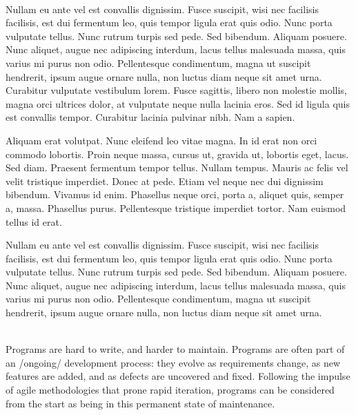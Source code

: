 \begin{titlepage}
\vspace{2cm}
\begin{addmargin}[-1cm]{-4cm}
\begin{flushright}
\sffamily\LARGE\titleen
\end{flushright}
\vfill
\noindent
\begin{minipage}[t]{9cm}

\\
Nullam eu ante vel est convallis dignissim.  Fusce suscipit, wisi nec facilisis
facilisis, est dui fermentum leo, quis tempor ligula erat quis odio.  Nunc porta
vulputate tellus.  Nunc rutrum turpis sed pede.  Sed bibendum.  Aliquam posuere.
Nunc aliquet, augue nec adipiscing interdum, lacus tellus malesuada massa, quis
varius mi purus non odio.  Pellentesque condimentum, magna ut suscipit
hendrerit, ipsum augue ornare nulla, non luctus diam neque sit amet urna.
Curabitur vulputate vestibulum lorem.  Fusce sagittis, libero non molestie
mollis, magna orci ultrices dolor, at vulputate neque nulla lacinia eros.  Sed
id ligula quis est convallis tempor.  Curabitur lacinia pulvinar nibh.  Nam a
sapien.

Aliquam erat volutpat.  Nunc eleifend leo vitae magna.  In id erat non orci
commodo lobortis.  Proin neque massa, cursus ut, gravida ut, lobortis eget,
lacus.  Sed diam.  Praesent fermentum tempor tellus.  Nullam tempus.  Mauris ac
felis vel velit tristique imperdiet.  Donec at pede.  Etiam vel neque nec dui
dignissim bibendum.  Vivamus id enim.  Phasellus neque orci, porta a, aliquet
quis, semper a, massa.  Phasellus purus.  Pellentesque tristique imperdiet
tortor.  Nam euismod tellus id erat.

Nullam eu ante vel est convallis dignissim.  Fusce suscipit, wisi nec facilisis
facilisis, est dui fermentum leo, quis tempor ligula erat quis odio.  Nunc porta
vulputate tellus.  Nunc rutrum turpis sed pede.  Sed bibendum.  Aliquam posuere.
Nunc aliquet, augue nec adipiscing interdum, lacus tellus malesuada massa, quis
varius mi purus non odio.  Pellentesque condimentum, magna ut suscipit
hendrerit, ipsum augue ornare nulla, non luctus diam neque sit amet urna.
\end{minipage}%
\hspace{1cm}%
\begin{minipage}[t]{9cm}
\\
Programs are hard to write, and harder to maintain.  Programs are often part of
an /ongoing/ development process: they evolve as requirements change, as new
features are added, and as defects are uncovered and fixed.  Following the
impulse of agile methodologies that prone rapid iteration, programs can be
considered from the start as being in this permanent state of maintenance.


\end{minipage}
\end{addmargin}
\end{titlepage}
